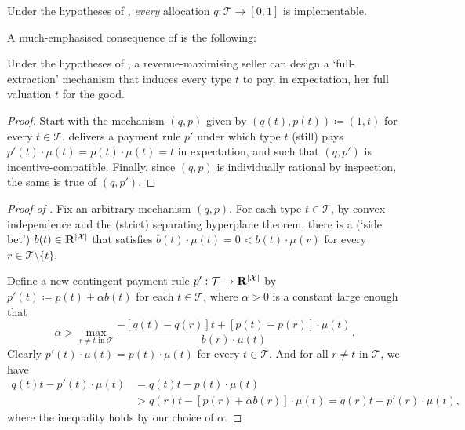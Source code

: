 \begin{corollary}
	\label{corollary:CremerMclean_implementability}
	Under the hypotheses of ,
	\emph{every} allocation $q : \mathcal{T} \to [0,1]$ is implementable.
\end{corollary}

A much-emphasised consequence of  is the following:

\begin{corollary}
	\label{corollary:CremerMclean_fullextraction}
	Under the hypotheses of ,
	a revenue-maximising seller can design a `full-extraction' mechanism that induces every type $t$ to pay, in expectation, her full valuation $t$ for the good.
\end{corollary}

\begin{proof}
	Start with the mechanism $(q,p)$ given by $(q(t),p(t)) \coloneqq (1,t)$ for every $t \in \mathcal{T}$.
	 delivers a payment rule $p'$
	under which type $t$ (still) pays
	$p'(t) \cdot \mu(t) = p(t) \cdot \mu(t) = t$ in expectation,
	and such that $(q,p')$ is incentive-compatible.
	Finally, since $(q,p)$ is individually rational by inspection,
	the same is true of $(q,p')$.
\end{proof}

\begin{proof}[Proof of ]
	Fix an arbitrary mechanism $(q,p)$.
	For each type $t \in \mathcal{T}$,
	by convex independence and the (strict) separating hyperplane theorem, there is a (`side bet') $b(t) \in \R^{\abs*{\mathcal{X}}}$ that satisfies $b(t) \cdot \mu(t) = 0 < b(t) \cdot \mu(r)$ for every $r \in \mathcal{T} \setminus \{t\}$.

	Define a new contingent payment rule $p' : \mathcal{T} \to \R^{\abs*{\mathcal{X}}}$ by $p'(t) \coloneqq p(t) + \alpha b(t)$ for each $t \in \mathcal{T}$,
	where $\alpha > 0$ is a constant large enough that
	\begin{equation*}
		\alpha
		> \max_{\text{$r \neq t$ in $\mathcal{T}$}} \frac{ - [ q(t) - q(r) ] t + [p(t)-p(r)] \cdot \mu(t) }
		{ b(r) \cdot \mu(t) } .
	\end{equation*}
	Clearly $p'(t) \cdot \mu(t) = p(t) \cdot \mu(t)$ for every $t \in \mathcal{T}$.
	And for all $r \neq t$ in $\mathcal{T}$, we have
	\begin{align*}
		q(t) t - p'(t) \cdot \mu(t)
		&= q(t) t - p(t) \cdot \mu(t)
		\\
		&> q(r) t - [ p(r) + \alpha b(r) ] \cdot \mu(t)
		= q(r) t - p'(r) \cdot \mu(t) ,
	\end{align*}	
	where the inequality holds by our choice of $\alpha$.
\end{proof}

